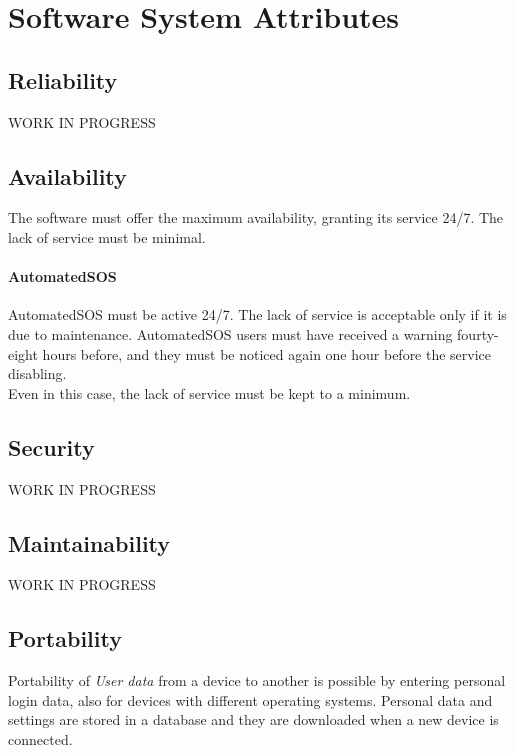\documentclass[../../rasd.tex]{subfiles}
\begin{document}
\section{Software System Attributes}
			
			\subsection{Reliability}
			WORK IN PROGRESS

			\subsection{Availability}
			The software must offer the maximum availability, granting its service 24/7. The lack of service must be minimal.
			\paragraph{AutomatedSOS}
			AutomatedSOS must be active 24/7. The lack of service is acceptable only if it is due to maintenance. AutomatedSOS users must have received a warning fourty-eight hours before, and they must be noticed again one hour before the service disabling. \\
			Even in this case, the lack of service must be kept to a minimum.

			\subsection{Security}
			WORK IN PROGRESS
			
			\subsection{Maintainability}
			WORK IN PROGRESS
			
			\subsection{Portability}
			Portability of \textit{User data} from a device to another is possible by entering personal login data, also for devices with different operating systems.
			Personal data and settings are stored in a database and they are downloaded when a new device is connected.
\end{document}

